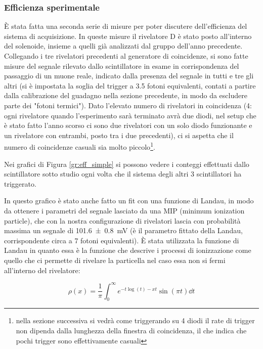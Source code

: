 \subsubsection{Efficienza sperimentale}
\`E stata fatta una seconda serie di misure per poter discutere dell'efficienza del sistema di acquisizione. In queste misure il rivelatore D \`e stato posto all'interno del solenoide, insieme a quelli gi\`a analizzati dal gruppo dell'anno precedente. Collegando i tre rivelatori precedenti al generatore di coincidenze, si sono fatte misure del segnale rilevato dallo scintillatore in esame in corrispondenza del passaggio di un muone reale, indicato dalla presenza del segnale in tutti e tre gli altri (si è impostata la soglia del trigger a 3.5 fotoni equivalenti, contati a partire dalla calibrazione del guadagno nella sezione precedente, in modo da escludere parte dei "fotoni termici"). Dato l'elevato numero di rivelatori in coincidenza (4: ogni rivelatore quando l'esperimento sarà terminato avrà due diodi, nel setup che è stato fatto l'anno scorso ci sono due rivelatori con un solo diodo funzionante e un rivelatore con entrambi, posto tra i due precedenti), ci si aspetta che il numero di coincidenze casuali sia molto piccolo\footnote{nella sezione successiva si vedr\`a come triggerando su 4 diodi il rate di trigger non dipenda dalla lunghezza della finestra di coincidenza, il che indica che pochi trigger sono effettivamente casuali}.

Nei grafici di Figura \ref{gr:eff_simple} si possono vedere i conteggi effettuati dallo scintillatore sotto studio ogni volta che il sistema degli altri 3 scintillatori ha triggerato.


In questo grafico \`e stato anche fatto un fit con una funzione di Landau, in modo da ottenere i parametri del segnale lasciato da una MIP (minimum ionization particle), che con la nostra configurazione di rivelatori lascia con probabilit\`a massima un segnale di \SI{101.6 +- 0.8}{\mV} (è il parametro fittato della Landau, corrispondente circa a 7 fotoni equivalenti). \`E stata utilizzata la funzione di Landau in quanto essa è la funzione che descrive i processi di ionizzazione come quello che ci permette di rivelare la particella nel caso essa non si fermi all'interno del rivelatore:

\begin{equation}
	\rho\left(x\right) = \frac{1}{\pi}\int_0^\infty e^{-t\log(t)-xt}\sin(\pi t) \dd t
	\label{eq:landau}
\end{equation}

